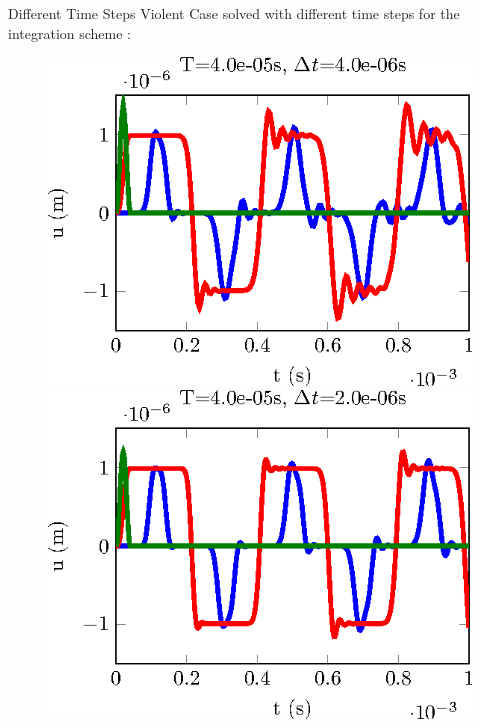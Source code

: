 \documentclass[10pt,a4paper]{beamer}
\begin{document}
\begin{frame}{Different Time Steps} 
	Violent Case solved with different time steps for the integration scheme :
	\begin{figure}
		\begin{minipage}{0.35\linewidth}
			\includegraphics[width=1\linewidth]{CalculSchem3.T1.dt4e-06.tikz.eps}
		\end{minipage}
		 \hspace{1cm}
		\begin{minipage}{0.35\linewidth}
			\includegraphics[width=1\linewidth]{CalculSchem3.T1.dt2e-06.tikz.eps}
		\end{minipage}

\end{figure}
\end{frame}
\end{document}

